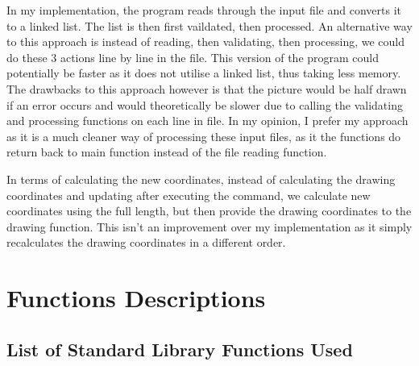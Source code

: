 \documentclass[a4paper, 12pt, titlepage]{article}
\begin{document}
In my implementation, the program reads through the input file and converts
it to a linked list. The list is then first vaildated, then processed. An
alternative way to this approach is instead of reading, then validating,
then processing, we could do these 3 actions line by line in the file.
This version of the program could potentially be faster as it does not
utilise a linked list, thus taking less memory. The drawbacks to this
approach however is that the picture would be half drawn if an error occurs
and would theoretically be slower due to calling the validating and
processing functions on each line in file. In my opinion, I prefer my
approach as it is a much cleaner way of processing these input files, as
it the functions do return back to main function instead of the file reading
function.

In terms of calculating the new coordinates, instead of calculating the
drawing coordinates and updating after executing the command, we calculate
new coordinates using the full length, but then provide the drawing
coordinates to the drawing function. This isn't an improvement over my
implementation as it simply recalculates the drawing coordinates in a
different order.

\newpage


\section{Functions Descriptions}

\subsection{List of Standard Library Functions Used}
\end{document}
